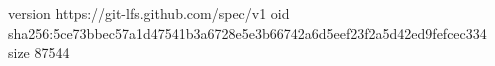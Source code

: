 version https://git-lfs.github.com/spec/v1
oid sha256:5ce73bbec57a1d47541b3a6728e5e3b66742a6d5eef23f2a5d42ed9fefcec334
size 87544
